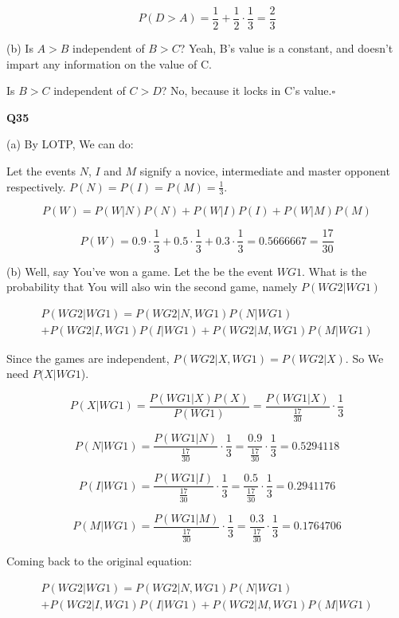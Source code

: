 \documentclass{article}
\newcommand{\qed}{\hfill$\square$}
\begin{document}
			$$P(D > A) = \frac{1}{2} + \frac{1}{2}\cdot\frac{1}{3} = \frac{2}{3}$$
			
			(b) Is $A > B$ independent of $B > C$? Yeah, B's value is a constant, and doesn't impart any information on the value of C. 
			
			Is $B > C$ independent of $C > D$? No, because it locks in C's value.\qed
			
			\hfill
			
		\textbf{Q35}
		
			(a) By LOTP, We can do:
			
			Let the events $N$, $I$ and $M$ signify a novice, intermediate and master opponent respectively. $P(N) = P(I) = P(M) = \frac{1}{3}$.
			
			$$P(W) = P(W\vert N)P(N) + P(W\vert I)P(I) + P(W\vert M)P(M)$$
			
			$$P(W) = 0.9\cdot\frac{1}{3} + 0.5\cdot\frac{1}{3} + 0.3\cdot\frac{1}{3} = 0.5666667 = \frac{17}{30}$$
			
			(b) Well, say You've won a game. Let the be the event $WG1$. What is the probability that You will also win the second game, namely $P(WG2\vert WG1)$
			
			\begin{multline*}
			P(WG2\vert WG1) = P(WG2\vert N,WG1)P(N\vert WG1)\\
			 + P(WG2\vert I,WG1)P(I\vert WG1) + P(WG2\vert M,WG1)P(M\vert WG1)
			\end{multline*}
			
			Since the games are independent, $P(WG2\vert X, WG1) = P(WG2\vert X)$. So We need $P(X\vert WG1$).
			
			$$P(X\vert WG1) = \frac{P(WG1\vert X)P(X)}{P(WG1)} = \frac{P(WG1\vert X)}{\frac{17}{30}}\cdot\frac{1}{3}$$
			
			$$P(N\vert WG1) = \frac{P(WG1\vert N)}{\frac{17}{30}}\cdot\frac{1}{3} = \frac{0.9}{\frac{17}{30}}\cdot\frac{1}{3} = 0.5294118$$
			
			$$P(I\vert WG1) = \frac{P(WG1\vert I)}{\frac{17}{30}}\cdot\frac{1}{3} = \frac{0.5}{\frac{17}{30}}\cdot\frac{1}{3} = 0.2941176$$
			
			$$P(M\vert WG1) = \frac{P(WG1\vert M)}{\frac{17}{30}}\cdot\frac{1}{3} = \frac{0.3}{\frac{17}{30}}\cdot\frac{1}{3} = 0.1764706$$
			
			Coming back to the original equation:
			
			\begin{multline*}
			P(WG2\vert WG1) = P(WG2\vert N,WG1)P(N\vert WG1)\\
			 + P(WG2\vert I,WG1)P(I\vert WG1) + P(WG2\vert M,WG1)P(M\vert WG1)
			\end{multline*}
			
\end{document}
